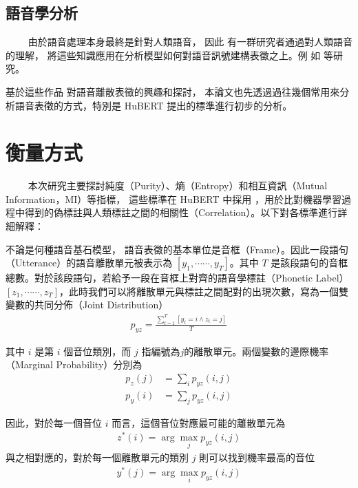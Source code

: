 \subsection{語音學分析}

　　
由於語音處理本身最終是針對人類語音，
因此
有一群研究者通過對人類語音的理解，
將這些知識應用在分析模型如何對語音訊號建構表徵之上。例
如 \cite{deseyssel22_interspeech, wells_phonetic_2022, 10097097, abdullah23_interspeech} 等研究。

        基於這些作品
對語音離散表徵的興趣和探討，  %
本論文也先透過過往幾個常用來分析語音表徵的方式，特別是
HuBERT \cite{hsu_hubert_2021-2} 提出的標準進行初步的分析。

\section{衡量方式}

　　
本次研究主要探討純度（Purity）、熵（Entropy）和相互資訊（Mutual Information，MI）等指標，
這些標準在 HuBERT 中採用 \cite{hsu_hubert_2021, hsu_hubert_2021-2}，用於比對機器學習過程中得到的偽標註與人類標註之間的相關性（Correlation）。以下對各標準進行詳細解釋：

        不論是何種語音基石模型，
語音表徵的基本單位是音框（Frame）。因此一段語句（Utterance）的語音離散單元被表示為 $[y_1, \cdots\cdots, y_T]$。其中 $T$ 是該段語句的音框總數。對於該段語句，若給予一段在音框上對齊的語音學標註（Phonetic Label） $[z_1, \cdots\cdots, z_T]$，此時我們可以將離散單元與標註之間配對的出現次數，寫為一個雙變數的共同分佈（Joint Distribution）
    \begin{align}
      p_{yz} = \frac{\sum^T_{t=1}[{y_t = i \wedge z_t = j}]}{T}
    \end{align}

其中 $i$ 是第 $i$ 個音位類別，而 $j$ 指編號為$j$的離散單元。兩個變數的邊際機率（Marginal Probability）分別為
    \begin{align}
    p_z(j) &=\sum_i{p_{yz}(i, j)} \\
    p_y(i) &=\sum_j{p_{yz}(i, j)} 
\end{align}

因此，對於每一個音位 $i$ 而言，這個音位對應最可能的離散單元為
    \begin{align}
      z^\ast(i) = \arg\max_j p_{yz}(i, j)
    \end{align}
與之相對應的，對於每一個離散單元的類別 $j$ 則可以找到機率最高的音位
    \begin{align}
      y^\ast(j) = \arg\max_i p_{yz}(i,j)
    \end{align}


